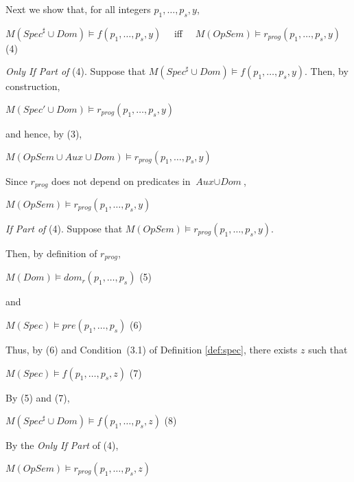 \documentclass[english]{tlp}
\begin{document}
\smallskip
\noindent
Next we show that,  for all integers $p_1,\ldots,p_s,y$,

\smallskip

$M(\textit{Spec}^{\sharp} \cup \textit{Dom} ) \models f(p_1,\ldots,p_s,y)$  
\ \ iff  \ \
$M(\textit{OpSem}) \models r_{\textit{prog}}(p_1,\ldots,p_s,y)$ \hfill (4)

\smallskip\noindent
{\it Only If Part of} (4).
Suppose  that
$M(\textit{Spec}^{\sharp} \cup \textit{Dom}) \models f(p_1,\ldots,p_s,y)$. Then, by 
construction,

\smallskip

$M(\textit{Spec}'\cup \textit{Dom} ) \models r_{\textit{prog}}(p_1,\ldots,p_s,y)$

\smallskip

\noindent
and hence, by (3),

\smallskip

$M(\textit{OpSem} \cup \textit{Aux}\cup \textit{Dom}) \models r_{\textit{prog}}(p_1,\ldots,p_s,y)$ 

\smallskip

\noindent
Since $r_{\textit{prog}}$ does not depend on predicates in $ \textit{Aux}\cup \textit{Dom}$,

\smallskip

$M(\textit{OpSem}) \models r_{\textit{prog}}(p_1,\ldots,p_s,y)$


\medskip

\noindent
{\it If Part of} (4). 
Suppose that
$M(\textit{OpSem}) \models r_{\textit{prog}}(p_1,\ldots,p_s,y)$.

\noindent
Then, by definition of  $ r_{\textit{prog}}$,

\smallskip
$M(\textit{Dom}) \models {\textit{dom}_r}(p_1,\ldots,p_s)$ \hfill (5)

\noindent
and 

$M(\textit{Spec}) \models {\textit{pre}}(p_1,\ldots,p_s)$  \hfill (6)

\smallskip
\noindent
Thus, by (6) and {Condition~(3.1)}
of Definition \ref{def:spec}, there exists $z$ such that 

\smallskip
$M(\textit{Spec})\models f(p_1,\ldots,p_s,z) $ \hfill (7)

\smallskip
\noindent
By (5) and (7),

\smallskip
$M(\textit{Spec}^{\sharp}\cup \textit{Dom})\models f(p_1,\ldots,p_s,z) $ \hfill (8)

\smallskip
\noindent
By the {\it Only If Part} of (4), 

\smallskip
$M(\textit{OpSem})\models r_{\textit{prog}}(p_1,\ldots,p_s,z)$ 
\end{document}

